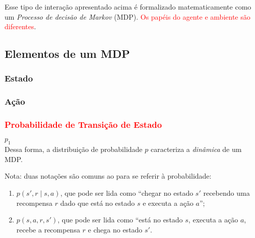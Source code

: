 \documentclass{article}
\begin{document}
        Esse tipo de interação apresentado acima é formalizado matematicamente como um \emph{Processo de decisão de Markov} (MDP). \textcolor{red}{Os papéis do agente e ambiente são diferentes}.
    
        \subsection{Elementos de um MDP}
    
            \subsubsection{Estado}
            
                
            \subsubsection{Ação}
            
                
            \subsubsection{\textcolor{red}{Probabilidade de Transição de Estado}}
            
                $p_1$ \\
            
                Dessa forma, a distribuição de probabilidade $p$ caracteriza a \emph{dinâmica} de um MDP.
            
                Nota: duas notações são comuns ao para se referir à probabilidade:
                
                \begin{enumerate}
                    \item $p(s', r \mid s, a)$, que pode ser lida como ``chegar no estado $s'$ recebendo uma recompensa $r$ dado que está no estado $s$ e executa a ação $a$'';
                    \item $p(s, a, r, s')$, que pode ser lida como ``está no estado $s$, executa a ação $a$, recebe a recompensa $r$ e chega no estado $s'$.
                \end{enumerate}
                
\end{document}
